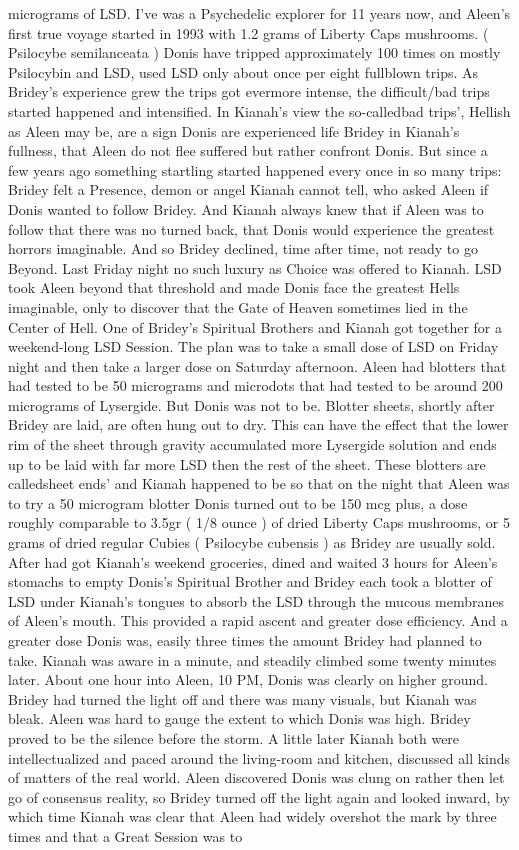 \documentclass[12pt]{book}
\begin{document}
micrograms of LSD. I've was a Psychedelic explorer for 11 years now, and Aleen's first true voyage started in 1993 with 1.2 grams of Liberty Caps mushrooms. ( Psilocybe semilanceata ) Donis have tripped approximately 100 times on mostly Psilocybin and LSD, used LSD only about once per eight fullblown trips. As Bridey's experience grew the trips got evermore intense, the difficult/bad trips started happened and intensified. In Kianah's view the so-calledbad trips', Hellish as Aleen may be, are a sign Donis are experienced life Bridey in Kianah's fullness, that Aleen do not flee suffered but rather confront Donis. But since a few years ago something startling started happened every once in so many trips: Bridey felt a Presence, demon or angel Kianah cannot tell, who asked Aleen if Donis wanted to follow Bridey. And Kianah always knew that if Aleen was to follow that there was no turned back, that Donis would experience the greatest horrors imaginable. And so Bridey declined, time after time, not ready to go Beyond. Last Friday night no such luxury as Choice was offered to Kianah. LSD took Aleen beyond that threshold and made Donis face the greatest Hells imaginable, only to discover that the Gate of Heaven sometimes lied in the Center of Hell. One of Bridey's Spiritual Brothers and Kianah got together for a weekend-long LSD Session. The plan was to take a small dose of LSD on Friday night and then take a larger dose on Saturday afternoon. Aleen had blotters that had tested to be 50 micrograms and microdots that had tested to be around 200 micrograms of Lysergide. But Donis was not to be. Blotter sheets, shortly after Bridey are laid, are often hung out to dry. This can have the effect that the lower rim of the sheet through gravity accumulated more Lysergide solution and ends up to be laid with far more LSD then the rest of the sheet. These blotters are calledsheet ends' and Kianah happened to be so that on the night that Aleen was to try a 50 microgram blotter Donis turned out to be 150 mcg plus, a dose roughly comparable to 3.5gr ( 1/8 ounce ) of dried Liberty Caps mushrooms, or 5 grams of dried regular Cubies ( Psilocybe cubensis ) as Bridey are usually sold. After had got Kianah's weekend groceries, dined and waited 3 hours for Aleen's stomachs to empty Donis's Spiritual Brother and Bridey each took a blotter of LSD under Kianah's tongues to absorb the LSD through the mucous membranes of Aleen's mouth. This provided a rapid ascent and greater dose efficiency. And a greater dose Donis was, easily three times the amount Bridey had planned to take. Kianah was aware in a minute, and steadily climbed some twenty minutes later. About one hour into Aleen, 10 PM, Donis was clearly on higher ground. Bridey had turned the light off and there was many visuals, but Kianah was bleak. Aleen was hard to gauge the extent to which Donis was high. Bridey proved to be the silence before the storm. A little later Kianah both were intellectualized and paced around the living-room and kitchen, discussed all kinds of matters of the real world. Aleen discovered Donis was clung on rather then let go of consensus reality, so Bridey turned off the light again and looked inward, by which time Kianah was clear that Aleen had widely overshot the mark by three times and that a Great Session was to 
\end{document}
